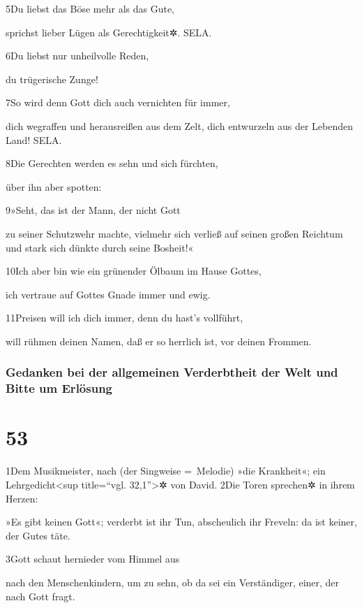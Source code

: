 5Du liebst das Böse mehr als das Gute,

sprichst lieber Lügen als Gerechtigkeit✲. SELA.

6Du liebst nur unheilvolle Reden,

du trügerische Zunge!

7So wird denn Gott dich auch vernichten für immer,

dich wegraffen und herausreißen aus dem Zelt, dich entwurzeln aus der
Lebenden Land! SELA.

8Die Gerechten werden es sehn und sich fürchten,

über ihn aber spotten:

9»Seht, das ist der Mann, der nicht Gott

zu seiner Schutzwehr machte, vielmehr sich verließ auf seinen großen
Reichtum und stark sich dünkte durch seine Bosheit!«

10Ich aber bin wie ein grünender Ölbaum im Hause Gottes,

ich vertraue auf Gottes Gnade immer und ewig.

11Preisen will ich dich immer, denn du hast's vollführt,

will rühmen deinen Namen, daß er so herrlich ist, vor deinen Frommen.

\hypertarget{gedanken-bei-der-allgemeinen-verderbtheit-der-welt-und-bitte-um-erluxf6sung-1}{%
\subsubsection{Gedanken bei der allgemeinen Verderbtheit der Welt und
Bitte um
Erlösung}\label{gedanken-bei-der-allgemeinen-verderbtheit-der-welt-und-bitte-um-erluxf6sung-1}}

\hypertarget{section-52}{%
\section{53}\label{section-52}}

1Dem Musikmeister, nach (der Singweise =~Melodie) »die Krankheit«; ein
Lehrgedicht\textless sup title=``vgl. 32,1''\textgreater✲ von David.
2Die Toren sprechen✲ in ihrem Herzen:

»Es gibt keinen Gott«; verderbt ist ihr Tun, abscheulich ihr Freveln: da
ist keiner, der Gutes täte.

3Gott schaut hernieder vom Himmel aus

nach den Menschenkindern, um zu sehn, ob da sei ein Verständiger, einer,
der nach Gott fragt.

